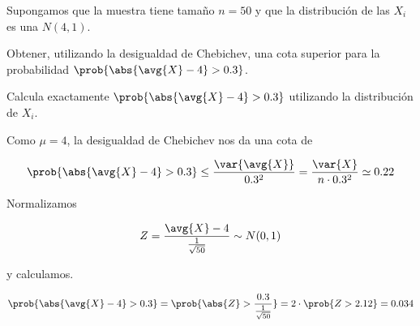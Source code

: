 \begin{problem}[2] Supongamos que la muestra tiene tamaño $n=50$ y que la distribución de las $X_i$ es una $N(4,1)$. 

\ppart Obtener, utilizando la desigualdad de Chebichev, una cota superior para la probabilidad $\prob{\abs{\avg{X} - 4} > 0.3}$.

\ppart Calcula exactamente $\prob{\abs{\avg{X} - 4} > 0.3}$ utilizando la distribución de $X_i$. 

\solution
\spart

Como $\mu = 4$, la desigualdad de Chebichev nos da una cota de 

\[
\prob{\abs{\avg{X} - 4} > 0.3} \leq
\frac{\var{\avg{X}}}{0.3^2} =
\frac{\var{X}}{n \cdot 0.3^2} \simeq 0.22
\]

\spart

Normalizamos

\[ Z = \frac{\avg{X} - 4}{\frac{1}{\sqrt{50}}} \sim N(0,1) \]

y calculamos.

\[ \prob{\abs{\avg{X} - 4} > 0.3} = \prob{\abs{Z} > \frac{0.3}{\frac{1}{\sqrt{50}}}} = 2 \cdot \prob{Z > 2.12} = 0.034 \]

\end{problem}

